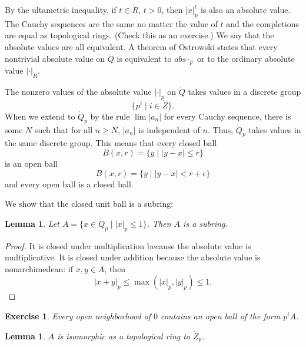 \documentclass{amsart}
\newtheorem{lemma}[equation]{Lemma}
\newtheorem{exercise}{Exercise}
\def\abs#1{{|#1|}}
\def\RR{\ring{R}}
\begin{document}
By the ultametric inequality, if $t\in \RR$, $t>0$, then
$\abs{x}_p^t$ is also an absolute value.  The Cauchy sequences are the
same no matter the value of $t$ and the completions are equal as
topological rings.  (Check this as an exercise.)  We say that the
absolute values are all equivalent.  A theorem of Ostrowski
\cite[Theorem 6.15]{knapp-advanced} states that every nontrivial
absolute value on $\ring{Q}$ is equivalent to $abs{\cdot}_p$ or to the
ordinary absolute value $\abs{\cdot}_{\RR}$.

The nonzero values of the
absolute value $\abs{\cdot}_p$ on $\ring{Q}$ takes values in a discrete group
\[
\{p^i \mid i\in \ring{Z}\}.
\]
When we extend to $\ring{Q}_p$ by the rule $\lim \abs{a_n}$ for every Cauchy
sequence, there is some
$N$ such that for all $n\ge N$, $\abs{a_n}$ is independent of $n$.
Thus, $\ring{Q}_p$ takes values in the same discrete group.
This means that every closed ball 
\[
B(x,r) = \{y\mid \abs{y-x}\le r\}
\]
is an open ball
\[
B(x,r) = \{y\mid \abs{y-x}< r+\epsilon\}
\]
and every open ball is a closed ball.

We show that the closed unit ball is a subring:

\begin{lemma}
Let $A = \{x\in \ring{Q}_p \mid \abs{x}_p\le 1\}$.
Then $A$ is a subring.
\end{lemma}

\begin{proof} It is closed under multiplication because the absolute
value is multiplicative.  It is closed under addition because the absolute
value is nonarchimedean:  if $x,y\in A$, then
\[
\abs{x + y}_p \le \max(\abs{x}_p,\abs{y}_p)\le 1.
\]
\end{proof}

\begin{exercise} Every open neighborhood of $0$ contains an open ball of the
form $p^i A$.
\end{exercise}


\begin{lemma}  $A$ is isomorphic as a topological ring to $\ring{Z}_p$.
\end{lemma}
\end{document}
